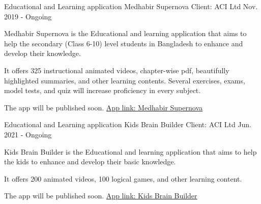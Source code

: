 
\begin{cventries}

  \cventry
    {Educational and Learning application} %
    {Medhabir Supernova} %
    {Client: ACI Ltd} %
    {Nov. 2019 - Ongoing} %
    {
      \begin{cvitems} %
        \item {Medhabir Supernova is the Educational and learning application that aims to help the secondary (Class 6-10) level students in Bangladesh to enhance and develop their knowledge.}
        \item {It offers 325 instructional animated videos, chapter-wise pdf, beautifully highlighted summaries, and other learning contents. Several exercises, exams, model tests, and quiz will increase proficiency in every subject.}
        \item {The app will be published soon. \href{https://fir-rtdb-1654a.firebaseapp.com/apk/Medhabir_Supernova.apk}{App link: \underline{Medhabir Supernova}} }
      \end{cvitems}
    }

  \cventry
    {Educational and Learning application} %
    {Kids Brain Builder} %
    {Client: ACI Ltd} %
    {Jun. 2021 - Ongoing} %
    {
      \begin{cvitems} %
        \item {Kids Brain Builder is the Educational and learning application that aims to help the kids to enhance and develop their basic knowledge.}
        \item {It offers 200 animated videos, 100 logical games, and other learning content. }
        \item {The app will be published soon. \href{https://fir-rtdb-1654a.firebaseapp.com/apk/Kids_Brain_Builder.apk}{App link: \underline{Kids Brain Builder}} }
      \end{cvitems}
    }

\end{cventries}

